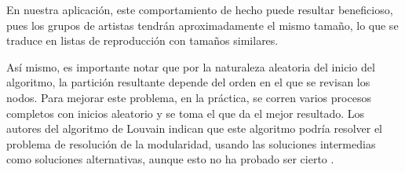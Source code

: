 \documentclass[conference]{IEEEtran}
\begin{document}
En nuestra aplicación, este comportamiento de hecho puede resultar beneficioso, pues los grupos de artistas tendrán aproximadamente el mismo tamaño, lo que se traduce en listas de reproducción con tamaños similares.


Así mismo, es importante notar que por la naturaleza aleatoria del inicio del algoritmo, la partición resultante depende del orden en el que se revisan los nodos. Para mejorar este problema, en la práctica, se corren varios procesos completos con inicios aleatorio y se toma el que da el mejor resultado. Los autores del algoritmo de Louvain indican que este algoritmo podría resolver el problema de resolución de la modularidad, usando las soluciones intermedias como soluciones alternativas, aunque esto no ha probado ser cierto \cite{Fortunato201075}.


%
%
%
%
%
\end{document}
